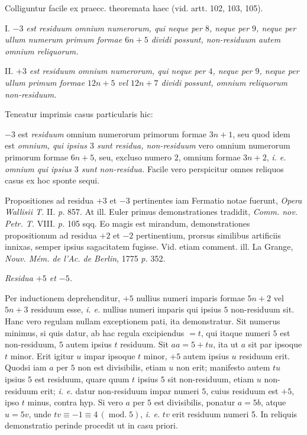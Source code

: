 
Colliguntur facile ex praecc. theoremata haec (vid. artt. 102, 103, 105).

I. $-3$ \emph{est residuum omnium numerorum, qui neque per $8$, neque per $9$, neque per ullum numerum primum formae $6n+5$ dividi possunt, non-residuum autem omnium reliquorum.}

II. $+3$ \emph{est residuum omnium numerorum, qui neque per $4$, neque per $9$, neque per ullum primum formae $12n+5$ vel $12n+7$ dividi possunt, omnium reliquorum non-residuum.}

Teneatur imprimis casus particularis hic:

$-3$ est \emph{residuum} omnium numerorum primorum formae $3n+1$, seu quod idem est \emph{omnium, qui ipsius $3$ sunt residua, non-residuum} vero omnium numerorum primorum formae $6n+5$, seu, excluso numero $2$, omnium formae $3n+2$, \emph{i. e. omnium qui ipsius $3$ sunt non-residua.} Facile vero perspicitur omnes reliquos casus ex hoc sponte sequi.

Propositiones ad residua $+3$ et $-3$ pertinentes iam Fermatio notae fuerunt, \emph{Opera Wallisii T.} II. \emph{p.} 857. At ill. Euler primus demonstrationes tradidit, \emph{Comm. nov. Petr. T.} VIII. \emph{p.} 105 sqq. Eo magis est mirandum, demonstrationes propositionum ad residua $+2$ et $-2$ pertinentium, prorsus similibus artificiis innixas, semper ipsius sagacitatem fugisse. Vid. etiam comment. ill. La Grange, \emph{Nouv. M\'em. de l'Ac. de Berlin}, 1775 \emph{p.} 352.

\begin{center}\emph{Residua $+5$ et $-5$.}\end{center}


Per inductionem deprehenditur, $+5$ nullius numeri imparis formae $5n+2$ vel $5n+3$ residuum esse, \emph{i. e.} nullius numeri imparis qui ipsius $5$ non-residuum sit. Hanc vero regulam nullam exceptionem pati, ita demonstratur. Sit numerus minimus, si quis datur, ab hac regula excipiendus $=t$, qui itaque numeri $5$ est non-residuum, $5$ autem ipsius $t$ residuum. Sit $aa=5+tu$, ita ut $a$ sit par ipsoque $t$ minor. Erit igitur $u$ impar ipsoque $t$ minor, $+5$ autem ipsius $u$ residuum erit. Quodsi iam $a$ per $5$ non est divisibilis, etiam $u$ non erit; manifesto autem $tu$ ipsius $5$ est residuum, quare quum $t$ ipsius $5$ sit non-residuum, etiam $u$ non-residuum erit; \emph{i. e.} datur non-residuum impar numeri $5$, cuius residuum est $+5$, ipso $t$ minus, contra hyp. Si vero $a$ per $5$ est divisibilis, ponatur $a=5b$, atque $u=5v$, unde $tv\equiv -1\equiv 4\,(\operatorname{mod.}5)$, \emph{i. e.} $tv$ erit residuum numeri 5. In reliquis demonstratio perinde procedit ut in casu priori.

